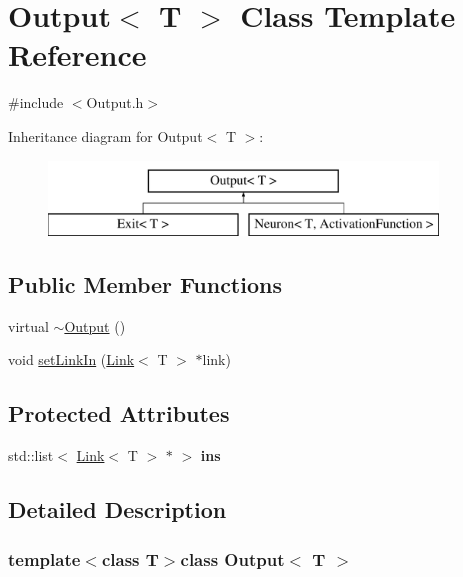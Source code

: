 \hypertarget{class_output}{\section{\-Output$<$ \-T $>$ \-Class \-Template \-Reference}
\label{class_output}
}


{\ttfamily \#include $<$\-Output.\-h$>$}

\-Inheritance diagram for \-Output$<$ \-T $>$\-:\begin{figure}[H]
\begin{center}
\leavevmode
\includegraphics[height=2.000000cm]{class_output}
\end{center}
\end{figure}
\subsection*{\-Public \-Member \-Functions}
\begin{DoxyCompactItemize}
\item 
virtual \hyperlink{class_output_aebe365bb0c9844b5456e74f0fb1a0a35}{$\sim$\-Output} ()
\item 
void \hyperlink{class_output_afd26f81d178846371c17d63015f2eb9f}{set\-Link\-In} (\hyperlink{class_link}{\-Link}$<$ \-T $>$ $\ast$link)
\end{DoxyCompactItemize}
\subsection*{\-Protected \-Attributes}
\begin{DoxyCompactItemize}
\item 
\hypertarget{class_output_ade68e41659b12f8a7e31f8dc8507bb50}{std\-::list$<$ \hyperlink{class_link}{\-Link}$<$ \-T $>$ $\ast$ $>$ {\bfseries ins}}\label{class_output_ade68e41659b12f8a7e31f8dc8507bb50}

\end{DoxyCompactItemize}


\subsection{\-Detailed \-Description}
\subsubsection*{template$<$class \-T$>$class Output$<$ T $>$}

